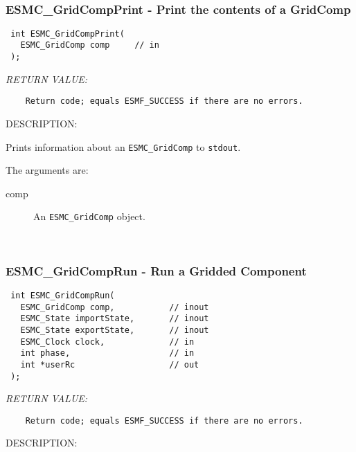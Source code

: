  
\mbox{}\hrulefill\ 
 
\subsubsection [ESMC\_GridCompPrint] {ESMC\_GridCompPrint - Print the contents of a GridComp}


  
\begin{verbatim} int ESMC_GridCompPrint(
   ESMC_GridComp comp     // in
 );\end{verbatim}{\em RETURN VALUE:}
\begin{verbatim}    Return code; equals ESMF_SUCCESS if there are no errors.\end{verbatim}
{\sf DESCRIPTION:\\ }


  
    Prints information about an {\tt ESMC\_GridComp} to {\tt stdout}.
  
    The arguments are:
    \begin{description}
    \item[comp]
      An {\tt ESMC\_GridComp} object.
   \end{description}
   
 
\mbox{}\hrulefill\ 
 
\subsubsection [ESMC\_GridCompRun] {ESMC\_GridCompRun - Run a Gridded Component}


  
\begin{verbatim} int ESMC_GridCompRun(
   ESMC_GridComp comp,           // inout
   ESMC_State importState,       // inout
   ESMC_State exportState,       // inout 
   ESMC_Clock clock,             // in
   int phase,                    // in
   int *userRc                   // out
 );\end{verbatim}{\em RETURN VALUE:}
\begin{verbatim}    Return code; equals ESMF_SUCCESS if there are no errors.\end{verbatim}
{\sf DESCRIPTION:\\ }


